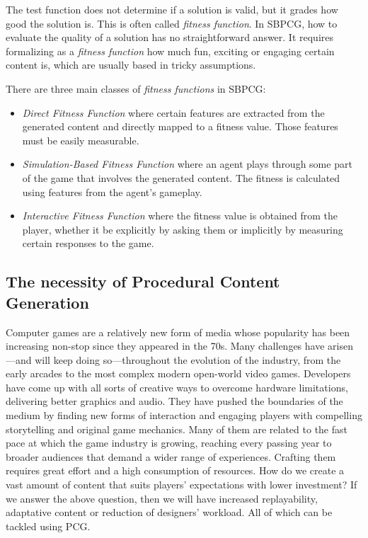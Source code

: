The test function does not determine if a solution is valid, but it grades how good the solution is. This is often called \textit{fitness function}. In SBPCG, how to evaluate the quality of a solution has no straightforward answer. It requires formalizing as a \textit{fitness function} how much fun, exciting or engaging certain content is, which are usually based in tricky assumptions.


There are three main classes of \textit{fitness functions} in SBPCG\cite{togelius2010search}:

\begin{itemize}
	\item \textit{Direct Fitness Function} where certain features are extracted from the generated content and directly mapped to a fitness value. Those features must be easily measurable.
	\item \textit{Simulation-Based Fitness Function} where an agent plays through some part of the game that involves the generated content. The fitness is calculated using features from the agent's gameplay. 
	
	\item \textit{Interactive Fitness Function} where the fitness value is obtained from the player, whether it be explicitly by asking them or implicitly by measuring certain responses to the game. 
\end{itemize}

\subsection{The necessity of Procedural Content Generation}
Computer games are a relatively new form of media whose popularity has been increasing non-stop since they appeared in the 70s. Many challenges have arisen---and will keep doing so---throughout the evolution of the industry, from the early arcades to the most complex modern open-world video games. Developers have come up with all sorts of creative ways to overcome hardware limitations, delivering better graphics and audio. They have pushed the boundaries of the medium by finding new forms of interaction and engaging players with compelling storytelling and original game mechanics. Many of them are related to the fast pace at which the game industry is growing, reaching every passing year to broader audiences that demand a wider range of experiences. Crafting them requires great effort and a high consumption of resources. How do we create a vast amount of content that suits players' expectations with lower investment? If we answer the above question, then we will have increased replayability, adaptative content or reduction of designers' workload. All of which can be tackled using PCG.\cite{togelius2016introduction}

